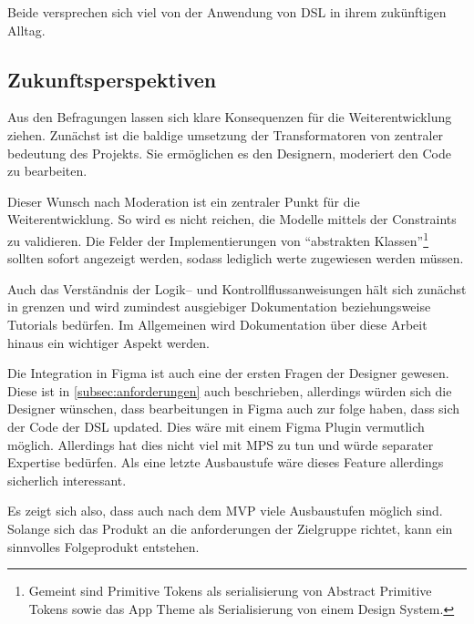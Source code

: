 Beide versprechen sich viel von der Anwendung von \ac{DSL} in ihrem zukünftigen Alltag.

\subsection{Zukunftsperspektiven}\label{subsec:zukunftsperspektive}
Aus den Befragungen lassen sich klare Konsequenzen für die Weiterentwicklung ziehen.
Zunächst ist die baldige umsetzung der Transformatoren von zentraler bedeutung des Projekts.
Sie ermöglichen es den Designern, moderiert den Code zu bearbeiten.

Dieser Wunsch nach Moderation ist ein zentraler Punkt für die Weiterentwicklung.
So wird es nicht reichen, die Modelle mittels der Constraints zu validieren.
Die Felder der Implementierungen von \enquote{abstrakten Klassen}\footnote{Gemeint sind Primitive Tokens als serialisierung von Abstract Primitive Tokens sowie das App Theme als Serialisierung von einem Design System.} sollten sofort angezeigt werden, sodass lediglich werte zugewiesen werden müssen.

Auch das Verständnis der Logik-- und Kontrollflussanweisungen hält sich zunächst in grenzen und wird zumindest ausgiebiger Dokumentation beziehungsweise Tutorials bedürfen.
Im Allgemeinen wird Dokumentation über diese Arbeit hinaus ein wichtiger Aspekt werden.

Die Integration in Figma ist auch eine der ersten Fragen der Designer gewesen.
Diese ist in \autoref{subsec:anforderungen} auch beschrieben, allerdings würden sich die Designer wünschen, dass bearbeitungen in Figma auch zur folge haben, dass sich der Code der \ac{DSL} updated.
Dies wäre mit einem Figma Plugin vermutlich möglich.
Allerdings hat dies nicht viel mit \ac{MPS} zu tun und würde separater Expertise bedürfen.
Als eine letzte Ausbaustufe wäre dieses Feature allerdings sicherlich interessant.

Es zeigt sich also, dass auch nach dem \ac{MVP} viele Ausbaustufen möglich sind.
Solange sich das Produkt an die anforderungen der Zielgruppe richtet, kann ein sinnvolles Folgeprodukt entstehen.